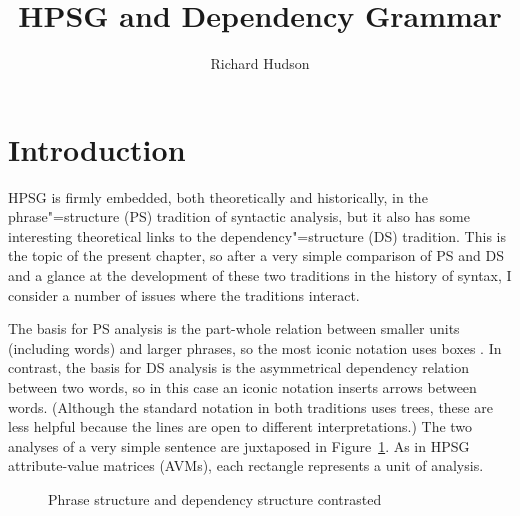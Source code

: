 \documentclass[output=paper
	        ,collection
	        ,collectionchapter
 	        ,biblatex
                ,babelshorthands
                ,newtxmath
                ,draftmode
                ,colorlinks, citecolor=brown
]{langscibook}
\author{Richard Hudson\affiliation{University College London}}
\title{HPSG and Dependency Grammar}
\begin{document}
\maketitle
\label{chap-dg}


\section{Introduction}
\label{sec:1}

HPSG is firmly embedded, both theoretically and historically, in the phrase"=structure (PS) tradition of syntactic analysis, but it also has some interesting theoretical links to the dependency"=structure (DS) tradition. This is the topic of the present chapter, so after a very simple comparison of PS and DS and a glance at the development of these two traditions in the history of syntax, I consider a number of issues where the traditions interact.

The basis for PS analysis is the part-whole relation between smaller units (including words) and larger phrases, so the most iconic notation uses boxes \citep[6]{MuellerGT-Eng2}. In contrast, the basis for DS analysis is the asymmetrical dependency relation between two words, so in this case an iconic notation inserts arrows between words. (Although the standard notation in both traditions uses trees, these are less helpful because the lines are open to different interpretations.) The two analyses of a very simple sentence are juxtaposed in Figure~\ref{fig:1}. As in HPSG attribute-value matrices (AVMs), each rectangle represents a unit of analysis.

\begin{figure}
  \centering

\vspace{\baselineskip}

%
	\caption{Phrase structure and dependency structure contrasted}
	\label{fig:1}
\end{figure}
\end{document}
